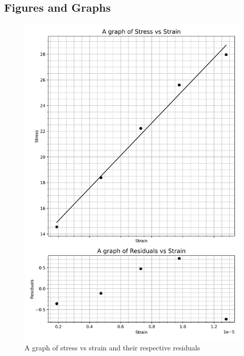 \documentclass[12pt, a4paper]{article}
\begin{document}
\subsection{Figures and Graphs}
\begin{figure}[H]
    \centering
    \includegraphics[width = \textwidth]{1Plot1.png}
    \caption{A graph of stress vs strain and their respective residuals}
    \label{fig:Fig 1.1}
\end{figure}
\end{document}
